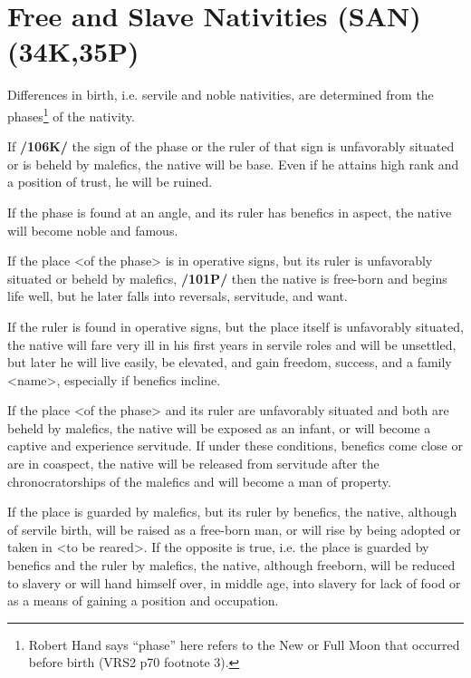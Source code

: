 \section{Free and Slave Nativities (SAN) (34K,35P)}
Differences in birth, i.e. servile and noble nativities, are determined from the phases\footnote{Robert Hand says ``phase'' here refers to the New or Full Moon that occurred before birth (VRS2 p70 footnote 3).} of the nativity.

If \textbf{/106K/} the sign of the phase or the ruler of that sign is unfavorably situated or is beheld by malefics, the
native will be base. Even if he attains high rank and a position of trust, he will be ruined. 

If the phase is found at an angle, and its ruler has benefics in aspect, the native will become noble and famous. 

If the place <of the phase> is in operative signs, but its ruler is unfavorably situated or beheld by malefics, \textbf{/101P/} then the native is free-born and begins life well, but he later falls into reversals, servitude, and want. 

If \mndl the ruler is found in operative signs, but the place itself is unfavorably situated, the native will fare very ill in his first years in servile roles and will be unsettled, but later he will live easily, be elevated, and gain freedom, success, and a family <name>, especially if benefics incline. 

If the place <of the phase> and its ruler are unfavorably situated and both are beheld by malefics, the native will be exposed as an infant, or will become a captive and experience servitude. If under these conditions, benefics come close or are in coaspect, the native will be released from servitude after the chronocratorships of the malefics and will become
a man of property. 

If the place is guarded by malefics, but its ruler by benefics, the native, although of servile birth, will be raised as a free-born man, or will rise by being adopted or taken in <to be reared>. If the opposite is true, i.e. the place is guarded by benefics and the ruler by malefics, the native, although freeborn, will be reduced to slavery or will hand himself over, in middle age, into slavery for lack of food or as a means of gaining a position and occupation.

\newpage